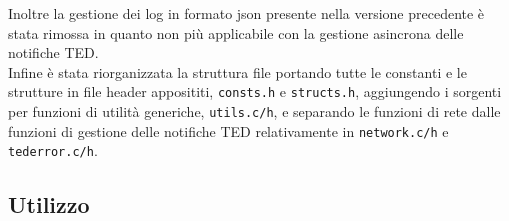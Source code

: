 \documentclass[a4paper,10pt]{article}
\begin{document}
Inoltre la gestione dei log in formato json presente nella versione
precedente è stata rimossa in quanto non più applicabile con la gestione
asincrona delle notifiche TED.\\

Infine è stata riorganizzata la struttura file portando tutte le
constanti e le strutture in file header apposititi, \texttt{consts.h} e
\texttt{structs.h}, aggiungendo i sorgenti per funzioni di utilità generiche,
\texttt{utils.c/h}, e separando le funzioni di rete dalle funzioni di
gestione delle notifiche TED relativamente in \texttt{network.c/h} e
\texttt{tederror.c/h}.

\subsection{Utilizzo}


{}

\end{document}
